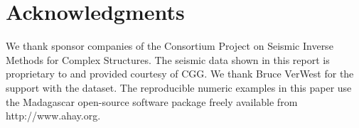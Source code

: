 \section{Acknowledgments}
We thank sponsor companies of the Consortium Project on Seismic 
Inverse Methods for Complex Structures.
The seismic data shown in this report is proprietary to and provided
courtesy of CGG.
 We thank Bruce VerWest for the support with the dataset. The reproducible 
numeric examples in this paper use the Madagascar
open-source software package \cite[]{m8r} freely available from
http://www.ahay.org.

